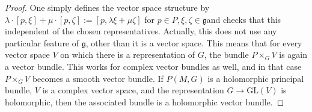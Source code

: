 \begin{proof}
    One simply defines the vector space structure by \(\lambda \cdot [p,  \xi]+\mu \cdot [p, \zeta]:=[p, \lambda \xi+\mu \zeta]\) for \(p \in P, \xi,\zeta \in \mathfrak{g}\)and checks that this independent of the chosen representatives. Actually, this does not use any particular feature of \(\mathfrak{g}\), other than it is a vector space. This means that for every vector space \(V\) on which there is a representation of \(G\), the bundle \(P\times_GV\) is again a vector bundle. This works for complex vector bundles as well, and in that case \(P \times_G V\) becomes a smooth vector bundle. If \(P(M,G)\) is a holomorphic principal bundle, \(V\) is a complex vector space, and the representation \(G \to \mathrm{GL}(V)\) is holomorphic, then the associated bundle is a holomorphic vector bundle.
\end{proof}

